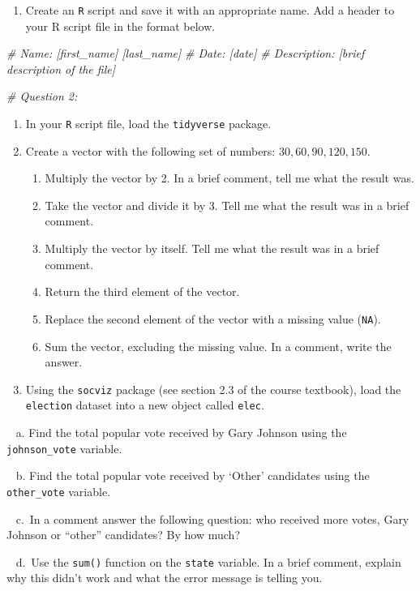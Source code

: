 \documentclass[
]{book}
\newenvironment{Shaded}{\begin{snugshade}}{\end{snugshade}}
\newcommand{\CommentTok}[1]{\textcolor[rgb]{0.56,0.35,0.01}{\textit{#1}}}
\providecommand{\tightlist}{%
  \setlength{\itemsep}{0pt}\setlength{\parskip}{0pt}}
\begin{document}
\begin{enumerate}
\def\labelenumi{\arabic{enumi}.}
\tightlist
\item
  Create an \texttt{R} script and save it with an appropriate name. Add a header to your R script file in the format below.
\end{enumerate}

\begin{Shaded}
\begin{Highlighting}[]
\CommentTok{\# Name: [first\_name] [last\_name]}
\CommentTok{\# Date: [date]}
\CommentTok{\# Description: [brief description of the file] }

\CommentTok{\# Question 2:}
\end{Highlighting}
\end{Shaded}

\begin{enumerate}
\def\labelenumi{\arabic{enumi}.}
\setcounter{enumi}{1}
\item
  In your \texttt{R} script file, load the \texttt{tidyverse} package.
\item
  Create a vector with the following set of numbers: \({30, 60, 90, 120, 150}\).

  \begin{enumerate}
  \def\labelenumii{\alph{enumii}.}
  \item
    Multiply the vector by 2. In a brief comment, tell me what the result was.
  \item
    Take the vector and divide it by 3. Tell me what the result was in a brief comment.
  \item
    Multiply the vector by itself. Tell me what the result was in a brief comment.
  \item
    Return the third element of the vector.
  \item
    Replace the second element of the vector with a missing value (\texttt{NA}).
  \item
    Sum the vector, excluding the missing value. In a comment, write the answer.
  \end{enumerate}
\item
  Using the \texttt{socviz} package (see section 2.3 of the course textbook), load the \texttt{election} dataset into a new object called \texttt{elec}.
\end{enumerate}

~ a. Find the total popular vote received by Gary Johnson using the \texttt{johnson\_vote} variable.

~ b. Find the total popular vote received by `Other' candidates using the \texttt{other\_vote} variable.

~ c.~In a comment answer the following question: who received more votes, Gary Johnson or ``other'' candidates? By how much?

~ d.~Use the \texttt{sum()} function on the \texttt{state} variable. In a brief comment, explain why this didn't work and what the error message is telling you.

  
\end{document}
